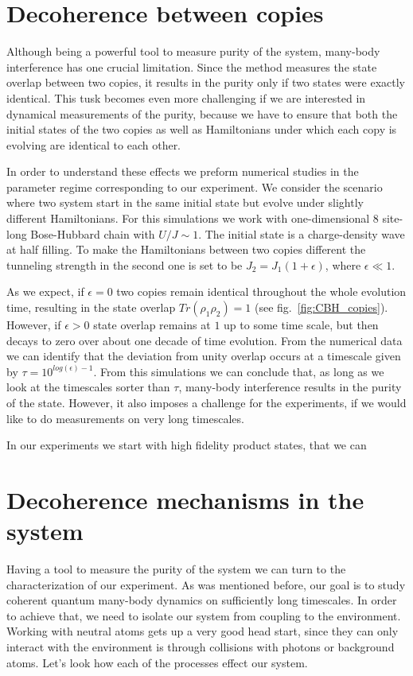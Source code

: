 \section{Decoherence between copies}
Although being a powerful tool to measure purity of the system, many-body interference has one crucial limitation. Since the method measures the state overlap between two copies, it results in the purity only if two states were exactly identical. This tusk becomes even more challenging if we are interested in dynamical measurements of the purity, because we have to ensure that both the initial states of the two copies as well as Hamiltonians under which each copy is evolving are identical to each other.

In order to understand these effects we preform numerical studies in the parameter regime corresponding to our experiment. We consider the scenario where two system start in the same initial state but evolve under slightly different Hamiltonians. For this simulations we work with one-dimensional $8$ site-long Bose-Hubbard chain with $U/J\sim1$. The initial state is a charge-density wave at half filling. To make the Hamiltonians between two copies different the tunneling strength in the second one is set to be $J_2 = J_1(1+\epsilon)$, where $\epsilon \ll 1$. 

As we expect, if $\epsilon = 0$ two copies remain identical throughout the whole evolution time, resulting in the state overlap $Tr(\rho_1 \rho_2) = 1$ (see fig.~\ref{fig:CBH_copies}). However, if $\epsilon > 0$ state overlap remains at $1$ up to some time scale, but then decays to zero over about one decade of time evolution. From the numerical data we can identify that the deviation from unity overlap occurs at a timescale given by $\tau = 10^{log(\epsilon)-1}$. From this simulations we can conclude that, as long as we look at the timescales sorter than $\tau$, many-body interference results in the purity of the state. However, it also imposes a challenge for the experiments, if we would like to do measurements on very long timescales.

In our experiments we start with high fidelity product states, that we can 

\section{Decoherence mechanisms in the system}
Having a tool to measure the purity of the system we can turn to the characterization of our experiment. As was mentioned before, our goal is to study coherent quantum many-body dynamics on sufficiently long timescales. In order to achieve that, we need to isolate our system from coupling to the environment. Working with neutral atoms gets up a very good head start, since they can only interact with the environment is through collisions with photons or background atoms. Let's look how each of the processes effect our system.

